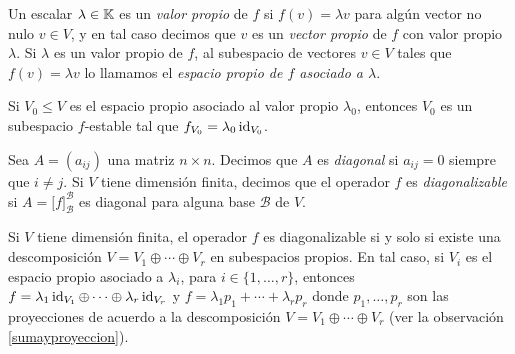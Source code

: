 \begin{defn}
  Un escalar $\lambda\in\mathbb{K}$ es un \emph{valor propio} de $f$ si $f(v)=\lambda v$ para algún vector no nulo $v\in V$, y en tal caso decimos que $v$ es un \emph{vector propio} de $f$ con valor propio $\lambda$. Si $\lambda$ es un valor propio de $f$, al subespacio de vectores $v\in V$ tales que $f(v)=\lambda v$ lo llamamos el \emph{espacio propio de $f$ asociado a $\lambda$}.
\end{defn}

\begin{obs}
  Si $V_0\le V$ es el espacio propio asociado al valor propio $\lambda_0$, entonces $V_0$ es un subespacio $f$-estable tal que $f_{V_0}=\lambda_0\operatorname{id}_{V_0}$.
\end{obs}

\begin{defn}
Sea $A=(a_{ij})$ una matriz $n\times n$. Decimos que $A$ es \emph{diagonal} si $a_{ij}=0$ siempre que $i\ne j$. Si $V$ tiene dimensión finita, decimos que el operador $f$ es \emph{diagonalizable} si $A=\Big[f\Big]^{\mathcal{B}}_{\mathcal{B}}$ es diagonal para alguna base $\mathcal{B}$ de $V$.
\end{defn}

\begin{teo}\label{diagosiysolosi}
Si $V$ tiene dimensión finita, el operador $f$ es diagonalizable si y solo si existe una descomposición $V=V_1\oplus\cdots\oplus V_r$ en subespacios propios. En tal caso, si $V_i$ es el espacio propio asociado a $\lambda_i$, para $i\in\{1,\ldots,r\}$, entonces $f=\lambda_1\operatorname{id}_{V_1}\oplus\cdots\oplus\lambda_r\operatorname{id}_{V_r}$ y $f=\lambda_1p_1+\cdots+\lambda_rp_r$ donde $p_1,\ldots,p_r$ son las proyecciones de acuerdo a la descomposición $V=V_1\oplus\cdots\oplus V_r$ (ver la observación \ref{sumayproyeccion}).
\end{teo}

